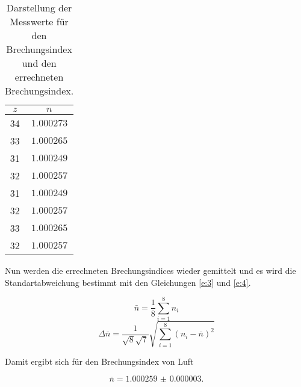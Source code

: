 \begin{table}[H]
  \centering
  \caption{Darstellung der Messwerte für den Brechungsindex und den errechneten Brechungsindex.}
  \label{tab:2}
  \begin{tabular}{c c}
    \toprule
    $z$ & $n$ \\
    \midrule
    34 & $\num{1.000273}$ \\
    33 & $\num{1.000265}$ \\
    31 & $\num{1.000249}$ \\
    32 & $\num{1.000257}$ \\
    31 & $\num{1.000249}$ \\
    32 & $\num{1.000257}$ \\
    33 & $\num{1.000265}$ \\
    32 & $\num{1.000257}$ \\
    \bottomrule
  \end{tabular}
\end{table}

Nun werden die errechneten Brechungsindices wieder gemittelt und es wird die
Standartabweichung bestimmt mit den Gleichungen \ref{e:3} und \ref{e:4}.

\begin{equation}
    \bar{n} = \frac{1}{8} \sum_{i=1}^{8} n_i
    \label{e:3}
\end{equation}
\begin{equation}
  \Delta \bar{n} = \frac{1}{\sqrt{8}\sqrt{7}} \sqrt{\sum_{i=1}^{8}(n_i-\bar{n})^2}
  \label{e:4}
\end{equation}

Damit ergibt sich für den Brechungsindex von Luft

\begin{equation*}
  \bar{n} = \num{1.000259(3)}.
\end{equation*}
